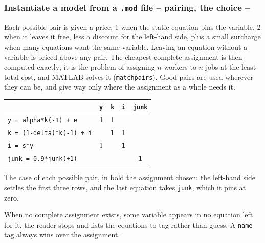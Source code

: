 \documentclass[10pt,slidestop]{beamer}
\theoremstyle{plain}
\begin{document}
\begin{frame}[fragile]
  \frametitle{Instantiate a model from a \texttt{.mod} file -- pairing, the choice --}

  Each possible pair is given a price: 1 when the static equation pins the variable, 2
  when it leaves it free, less a discount for the left-hand side, plus a small surcharge
  when many equations want the same variable. Leaving an
  equation without a variable is priced above any pair. The cheapest complete assignment
  is then computed exactly; it is the problem of assigning $n$ workers to $n$ jobs at the
  least total cost, and MATLAB solves it (\texttt{matchpairs}). Good pairs are used
  wherever they can be, and give way only where the assignment as a whole needs it.

  \begin{center}\small
  \begin{tabular}{l|cccc}
                                     & \texttt{y} & \texttt{k} & \texttt{i} & \texttt{junk} \\ \hline
    \texttt{y = alpha*k(-1) + e}     & \textbf{1} & 1          &            &               \\
    \texttt{k = (1-delta)*k(-1) + i} &            & \textbf{1} & 1          &               \\
    \texttt{i = s*y}                 & 1          &            & \textbf{1} &               \\
    \texttt{junk = 0.9*junk(+1)}     &            &            &            & \textbf{1}    \\
  \end{tabular}
  \end{center}
  \small The case of each possible pair, in bold the assignment chosen: the left-hand
  side settles the first three rows, and the last equation takes \texttt{junk}, which it
  pins at zero.

  When no complete assignment exists, some variable appears in no equation left for it,
  the reader stops and lists the equations to tag rather than guess. A \texttt{name} tag
  always wins over the assignment.

\end{frame}
\end{document}
